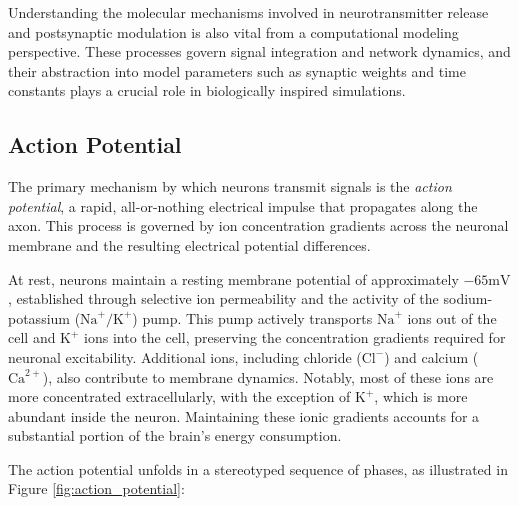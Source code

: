 Understanding the molecular mechanisms involved in neurotransmitter release and postsynaptic modulation is also vital from a computational modeling perspective. These processes govern signal integration and network dynamics, and their abstraction into model parameters such as synaptic weights and time constants plays a crucial role in biologically inspired simulations.

\subsection{Action Potential}
\label{subsec:action_potential}

The primary mechanism by which neurons transmit signals is the \emph{action potential}, a rapid, all-or-nothing electrical impulse that propagates along the axon. This process is governed by ion concentration gradients across the neuronal membrane and the resulting electrical potential differences.

At rest, neurons maintain a resting membrane potential of approximately $-65 \text{mV}$, established through selective ion permeability and the activity of the sodium-potassium ($\text{Na}^{+}/\text{K}^{+}$) pump. This pump actively transports $\text{Na}^{+}$ ions out of the cell and $\text{K}^{+}$ ions into the cell, preserving the concentration gradients required for neuronal excitability. Additional ions, including chloride ($\text{Cl}^{-}$) and calcium ($\text{Ca}^{2+}$), also contribute to membrane dynamics. Notably, most of these ions are more concentrated extracellularly, with the exception of $\text{K}^{+}$, which is more abundant inside the neuron. Maintaining these ionic gradients accounts for a substantial portion of the brain's energy consumption.

The action potential unfolds in a stereotyped sequence of phases, as illustrated in Figure \ref{fig:action_potential}:

